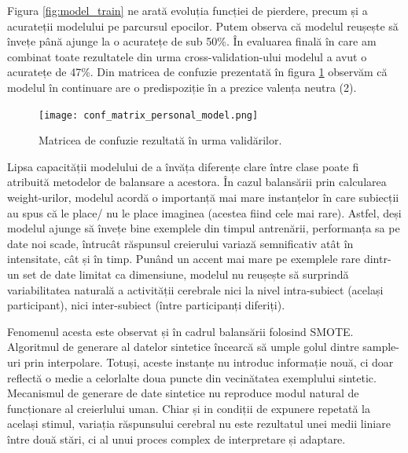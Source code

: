 Figura \ref{fig:model_train} ne arată evoluția funcției de pierdere, precum și a acurateții modelului pe parcursul epocilor. Putem observa că modelul reușește să învețe până ajunge la o acuratețe de sub 50\%. În evaluarea finală în care am combinat toate rezultatele din urma cross-validation-ului modelul a avut o acuratețe de 47\%. Din matricea de confuzie prezentată în figura \ref{fig:conf_matrix} observăm că modelul în continuare are o predispoziție în a prezice valența neutra (2).

\begin{figure}[h]
    \centering
    \texttt{[image: conf\_matrix\_personal\_model.png]}
    \caption{Matricea de confuzie rezultată în urma validărilor.}
    \label{fig:conf_matrix}
\end{figure}

Lipsa capacității modelului de a învăța diferențe clare între clase poate fi atribuită metodelor de balansare a acestora. În cazul balansării prin calcularea weight-urilor, modelul acordă o importanță mai mare instanțelor în care subiecții au spus că le place/ nu le place imaginea (acestea fiind cele mai rare). Astfel, deși modelul ajunge să învețe bine exemplele din timpul antrenării, performanța sa pe date noi scade, întrucât răspunsul creierului variază semnificativ atât în intensitate, cât și în timp. Punând un accent mai mare pe exemplele rare dintr-un set de date limitat ca dimensiune, modelul nu reușește să surprindă variabilitatea naturală a activității cerebrale nici la nivel intra-subiect (același participant), nici inter-subiect (între participanți diferiți).


Fenomenul acesta este observat și în cadrul balansării folosind SMOTE\cite{imblearn}. Algoritmul de generare al datelor sintetice încearcă să umple golul dintre sample-uri prin interpolare. Totuși, aceste instanțe nu introduc informație nouă, ci doar reflectă o medie a celorlalte doua puncte din vecinătatea exemplului sintetic. Mecanismul de generare de date sintetice nu reproduce modul natural de funcționare al creierlului uman. Chiar și in condiții de expunere repetată la același stimul, variația răspunsului cerebral nu este rezultatul unei medii liniare între două stări, ci al unui proces complex de interpretare și adaptare.